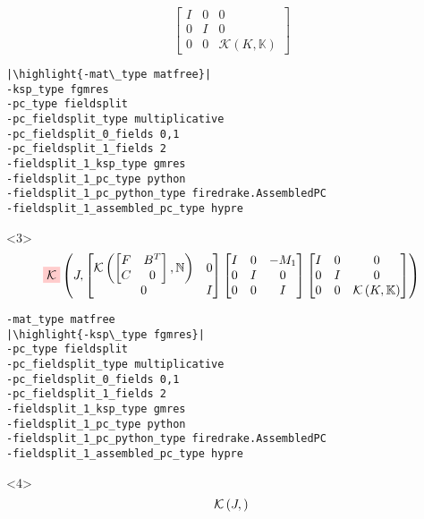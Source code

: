 \documentclass[presentation]{beamer}
\newcommand{\KSP}[2]{\ensuremath{\mathcal{K}\left(#1, \mathbb{#2}\right)}}
\newcommand{\ksp}[1]{\KSP{#1}{#1}}
\newcommand{\highlight}[1]{\colorbox{red!20}{\color{black} #1}}
\begin{document}
\begin{frame}[fragile]
\begin{onlyenv}
\begin{equation*}
{\begin{bmatrix}
        I & 0 & 0\\
        0 & I & 0\\
        0 & 0 &\ksp{K}
      \end{bmatrix}}
    \end{equation*}
\begin{verbatim}
|\highlight{-mat\_type matfree}|
-ksp_type fgmres
-pc_type fieldsplit
-pc_fieldsplit_type multiplicative
-pc_fieldsplit_0_fields 0,1
-pc_fieldsplit_1_fields 2
-fieldsplit_1_ksp_type gmres
-fieldsplit_1_pc_type python
-fieldsplit_1_pc_python_type firedrake.AssembledPC
-fieldsplit_1_assembled_pc_type hypre
\end{verbatim}
  \end{onlyenv}
  \begin{onlyenv}<3>
    \color{gray}
    \begin{equation*}
      \highlight{$\mathcal{K}$}\left(J,%
      \begin{bmatrix}
        \KSP{\begin{bmatrix}
            F & B^T\\
            C & 0
          \end{bmatrix}}{N} & 0\\
        0 & I
      \end{bmatrix}
      \begin{bmatrix}
        I & 0 & -M_1\\
        0 & I & 0 \\
        0 & 0 & I
      \end{bmatrix}
      \begin{bmatrix}
        I & 0 & 0\\
        0 & I & 0\\
        0 & 0 &\ksp{K}
      \end{bmatrix}\right)
    \end{equation*}
\begin{verbatim}
-mat_type matfree
|\highlight{-ksp\_type fgmres}|
-pc_type fieldsplit
-pc_fieldsplit_type multiplicative
-pc_fieldsplit_0_fields 0,1
-pc_fieldsplit_1_fields 2
-fieldsplit_1_ksp_type gmres
-fieldsplit_1_pc_type python
-fieldsplit_1_pc_python_type firedrake.AssembledPC
-fieldsplit_1_assembled_pc_type hypre
\end{verbatim}
  \end{onlyenv}
  \begin{onlyenv}<4>
    \color{gray}
    \begin{equation*}
      \KSP{J}{%
}
\end{equation*}
\end{onlyenv}
\end{frame}
\end{document}
